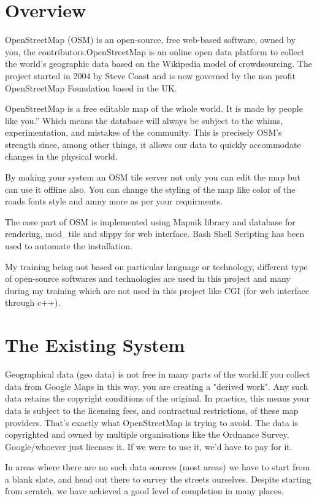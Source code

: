 \section{Overview}
OpenStreetMap (OSM) is an open-source, free web-based software, owned by you, the contributors.OpenStreetMap is an online open data platform to collect the world's geographic data based on the Wikipedia model of crowdsourcing. The project started in 2004 by Steve Coast and is now governed by the non profit OpenStreetMap Foundation based in the UK. 


OpenStreetMap is a free editable map of the whole world. It is made by people like you.” Which
means the database will always be subject to the whims, experimentation, and mistakes of the
community. This is precisely OSM’s strength since, among other things, it allows our data to
quickly accommodate changes in the physical world.


By making your system an OSM tile server not only you can edit the map but can use it offline
also. You can change the styling of the map like color of the roads fonts style and amny more as
per your requirments.


The core part of OSM is implemented using Mapnik library and database for rendering, mod\_tile and slippy
for web interface. Bash Shell Scripting has been used to automate the installation.


My training being not based on particular language or technology, different type of open-source softwares and technologies are
used in this project and many during my training which are not used in this
project like CGI (for web interface through c++).

\section{The Existing System}
Geographical data (geo data) is not free in many parts of the world.If you collect data from Google Maps in this way, you are creating a "derived work". Any such data retains the copyright conditions of the original. In practice, this means your data is subject to the licensing fees, and contractual restrictions, of these map providers. That's exactly what OpenStreetMap is trying to avoid. The data is copyrighted and owned by multiple organisations like the Ordnance Survey. Google/whoever just licenses it. If we were to use it, we'd have to pay for it. 

In areas where there are no such data sources (most areas) we have to start from a blank slate, and head out there to survey the streets ourselves. Despite starting from scratch, we have achieved a good level of completion in many places.  

